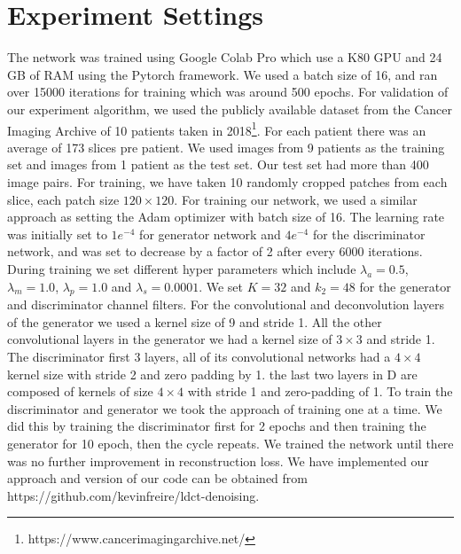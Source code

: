 \documentclass[journal]{IEEEtran}
\begin{document}
\section{Experiment Settings}
\label{experiment settings}
	The network was trained using Google Colab Pro which use a K80 GPU and 24 GB of RAM using the Pytorch framework. We used a batch size of 16,  and ran over 15000 iterations for training which was around 500 epochs.  For validation of our experiment algorithm, we used the publicly available dataset from the Cancer Imaging Archive of 10 patients taken in 2018\footnote{https://www.cancerimagingarchive.net/}.  For each patient there was an average of 173 slices pre patient.  We used images from 9 patients as the training set and images from 1 patient as the test set.  Our test set had more than 400 image pairs.  For training, we have taken 10 randomly cropped patches from each slice, each patch size $120 \times 120$.  For training our network, we used a similar approach as \cite{9474492} setting the Adam optimizer with batch size of 16.  The learning rate was initially set to $1e^{-4}$ for generator network and $4e^{-4}$ for the discriminator network, and was set to decrease by a factor of 2 after every 6000 iterations.  During training we set different hyper parameters which include $\lambda_a=0.5$, $\lambda_m=1.0$, $\lambda_p=1.0$ and $\lambda_s=0.0001$. We set $K=32$ and $k_2=48$ for the generator and discriminator channel filters.  For the convolutional and deconvolution layers of the generator we used a kernel size of 9 and stride 1.  All the other convolutional layers in the generator we had a kernel size of $3 \times 3$ and stride 1.   The discriminator first 3 layers, all of its convolutional networks had a $4 \times 4$ kernel size with stride 2 and zero padding by 1.  the last two layers in D are composed of kernels of size $4\times 4$ with stride 1 and zero-padding of 1. To train the discriminator and generator we took the approach of training one at a time.  We did this by training the discriminator first for 2 epochs and then training the generator for 10 epoch, then the cycle repeats.  We trained the network until there was no further improvement in reconstruction loss.  We have implemented our approach and version of our code can be obtained from https://github.com/kevinfreire/ldct-denoising.
	
\end{document}
